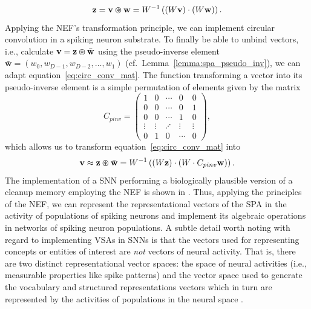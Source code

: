 \begin{equation}
\label{eq:circ_conv_mat}
\mathbf{z} = \mathbf{v} \varoast \mathbf{w} = W^{-1} \left( \left(W \mathbf{v}\right) \cdot \left(W \mathbf{w}\right)\right).
\end{equation}
Applying the \ac{NEF}'s transformation principle, we can implement circular convolution in a spiking neuron substrate.
To finally be able to unbind vectors, i.e., calculate $ \mathbf{v} = \mathbf{z} \varoast \bar{\mathbf{w}}$ using the pseudo-inverse element $ \bar{ \mathbf{w}} = \left(w_0, w_{D-1}, w_{D-2}, \ldots, w_{1}\right)$ (cf.\ Lemma~\ref{lemma:spa_pseudo_inv}), we can adapt equation~\eqref{eq:circ_conv_mat}.
The function transforming a vector into its pseudo-inverse element is a simple permutation of elements given by the matrix 
\begin{equation}
\label{eq:mat}
C_{pinv} = \left(
    \begin{matrix}
        1 & 0 &  \cdots & 0  & 0 \\
        0 & 0 &  \cdots & 0  & 1 \\
        0 & 0 &  \cdots & 1  & 0 \\
        \vdots & \vdots  & \iddots & \vdots  & \vdots \\
        0 & 1 &  0 & \cdots  & 0 
    \end{matrix}
\right),
\end{equation}
which allows us to transform equation~\eqref{eq:circ_conv_mat} into
\begin{equation}
\label{eq:unbind_mat}
\mathbf{v} \approx \mathbf{z} \varoast \bar{ \mathbf{w}} = W^{-1} \left( \left(W \mathbf{z}\right) \cdot \left(W \cdot C_{pinv} \mathbf{w}\right)\right).
\end{equation}
The implementation of a \ac{SNN} performing a biologically plausible version of a cleanup memory employing the \ac{NEF} is shown in \textcite{Stewart2011}.
Thus, applying the principles of the \ac{NEF}, we can represent the representational vectors of the \ac{SPA} in the activity of populations of spiking neurons and implement its algebraic operations in networks of spiking neuron populations.
A subtle detail worth noting with regard to implementing \acp{VSA} in \acp{SNN} is that the vectors used for representing concepts or entities of interest are \emph{not} vectors of neural activity.
That is, there are two distinct representational vector spaces: the space of neural activities (i.e., measurable properties like spike patterns) and the vector space used to generate the vocabulary and structured representations vectors which in turn are represented by the activities of populations in the neural space \parencite[see][for further details]{Eliasmith2013}.

